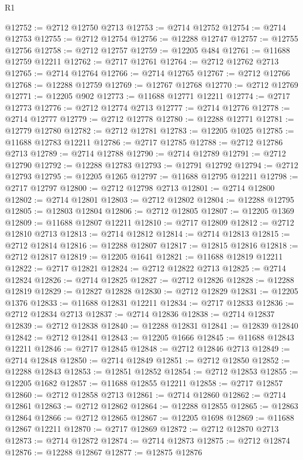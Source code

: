 \begin{lexlean}{R1}
\begin{coremodule}
@12752 := @2712 @12750 @2713
@12753 := @2714 @12752
@12754 := @2714 @12753
@12755 := @2712 @12754
@12756 := @12288 @12747
@12757 := @12755 @12756
@12758 := @2712 @12757
@12759 := @12205 @484
@12761 := @11688 @12759 @12211
@12762 := @2717 @12761
@12764 := @2712 @12762 @2713
@12765 := @2714 @12764
@12766 := @2714 @12765
@12767 := @2712 @12766
@12768 := @12288 @12759
@12769 := @12767 @12768
@12770 := @2712 @12769
@12771 := @12205 @902
@12773 := @11688 @12771 @12211
@12774 := @2717 @12773
@12776 := @2712 @12774 @2713
@12777 := @2714 @12776
@12778 := @2714 @12777
@12779 := @2712 @12778
@12780 := @12288 @12771
@12781 := @12779 @12780
@12782 := @2712 @12781
@12783 := @12205 @1025
@12785 := @11688 @12783 @12211
@12786 := @2717 @12785
@12788 := @2712 @12786 @2713
@12789 := @2714 @12788
@12790 := @2714 @12789
@12791 := @2712 @12790
@12792 := @12288 @12783
@12793 := @12791 @12792
@12794 := @2712 @12793
@12795 := @12205 @1265
@12797 := @11688 @12795 @12211
@12798 := @2717 @12797
@12800 := @2712 @12798 @2713
@12801 := @2714 @12800
@12802 := @2714 @12801
@12803 := @2712 @12802
@12804 := @12288 @12795
@12805 := @12803 @12804
@12806 := @2712 @12805
@12807 := @12205 @1369
@12809 := @11688 @12807 @12211
@12810 := @2717 @12809
@12812 := @2712 @12810 @2713
@12813 := @2714 @12812
@12814 := @2714 @12813
@12815 := @2712 @12814
@12816 := @12288 @12807
@12817 := @12815 @12816
@12818 := @2712 @12817
@12819 := @12205 @1641
@12821 := @11688 @12819 @12211
@12822 := @2717 @12821
@12824 := @2712 @12822 @2713
@12825 := @2714 @12824
@12826 := @2714 @12825
@12827 := @2712 @12826
@12828 := @12288 @12819
@12829 := @12827 @12828
@12830 := @2712 @12829
@12831 := @12205 @1376
@12833 := @11688 @12831 @12211
@12834 := @2717 @12833
@12836 := @2712 @12834 @2713
@12837 := @2714 @12836
@12838 := @2714 @12837
@12839 := @2712 @12838
@12840 := @12288 @12831
@12841 := @12839 @12840
@12842 := @2712 @12841
@12843 := @12205 @1666
@12845 := @11688 @12843 @12211
@12846 := @2717 @12845
@12848 := @2712 @12846 @2713
@12849 := @2714 @12848
@12850 := @2714 @12849
@12851 := @2712 @12850
@12852 := @12288 @12843
@12853 := @12851 @12852
@12854 := @2712 @12853
@12855 := @12205 @1682
@12857 := @11688 @12855 @12211
@12858 := @2717 @12857
@12860 := @2712 @12858 @2713
@12861 := @2714 @12860
@12862 := @2714 @12861
@12863 := @2712 @12862
@12864 := @12288 @12855
@12865 := @12863 @12864
@12866 := @2712 @12865
@12867 := @12205 @1698
@12869 := @11688 @12867 @12211
@12870 := @2717 @12869
@12872 := @2712 @12870 @2713
@12873 := @2714 @12872
@12874 := @2714 @12873
@12875 := @2712 @12874
@12876 := @12288 @12867
@12877 := @12875 @12876

\end{coremodule}
\end{lexlean}
